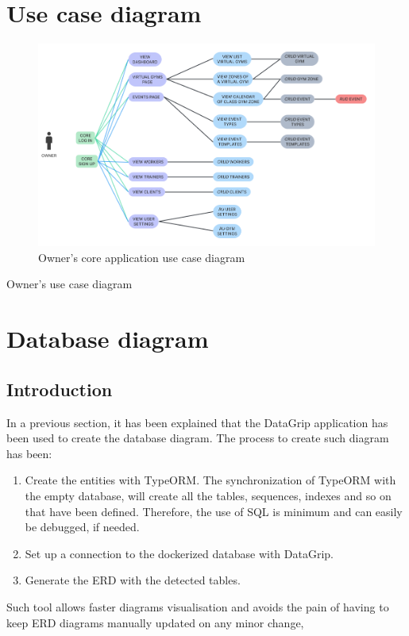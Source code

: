 \documentclass[a4paper, 12pt, oneside]{book}
\begin{document}
\section{Use case diagram}
\begin{figure}[H]
	\centering
	\includegraphics[width=\textwidth]{assets/use-case-diagrams/owner.png}
	\caption{Owner's core application use case diagram}
\end{figure}
Owner's use case diagram
\section{Database diagram}
\subsection{Introduction}
In a previous section, it has been explained that the DataGrip application has been used to create the database diagram. The process to create such diagram has been:
\begin{enumerate}[label = \textbf{\arabic{*}.}]
	\item Create the entities with TypeORM. The synchronization of TypeORM with the empty database, will create all the tables, sequences, indexes and so on that have been defined. Therefore, the use of SQL is minimum and can easily be debugged, if needed.
	\item Set up a connection to the dockerized database with DataGrip.
	\item Generate the ERD with the detected tables.
\end{enumerate}
Such tool allows faster diagrams visualisation and avoids the pain of having to keep ERD diagrams manually updated on any minor change,
\end{document}
